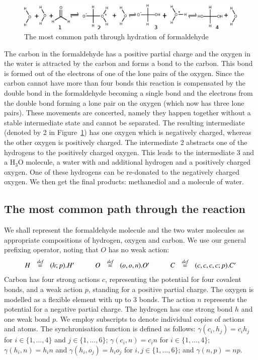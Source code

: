 \documentclass[preprint,12pt]{elsarticle}
\newcommand{\bydef}{\stackrel{\emph{def}}{=}}
\begin{document}
\begin{figure}[h!]
  \centering
    \includegraphics[width=1\textwidth]{formaldehyde2}
  \caption{The most common path through hydration of formaldehyde}
  \label{fig:formal2}
\end{figure}

The carbon in the formaldehyde has a positive partial charge and the oxygen in the water is attracted by 
the carbon and forms a bond to the carbon. This bond is formed out of the electrons of one of the lone 
pairs of the oxygen. 
Since the carbon cannot have more than four bonds this reaction is compensated by 
the double bond in the formaldehyde becoming a single bond and the electrons from the double bond 
forming a lone pair on the oxygen (which now has three lone pairs). These movements are 
concerted, namely they happen together without a stable intermediate state
and cannot be separated. The resulting intermediate (denoted by 2 in Figure~\ref{fig:formal2}) 
has one oxygen which is negatively charged, whereas the other oxygen is positively 
charged. The intermediate 2 abstracts one of the hydrogens to the positively charged oxygen. 
This leads to the intermediate 3 and a $\mathrm{H_3O}$ molecule, 
a water with and additional hydrogen and a positively charged oxygen. One of these hydrogens can be 
re-donated to the negatively charged oxygen. We then get the final products:
methanediol and a molecule of water.

\subsection{The most common path through the reaction}

We shall represent the formaldehyde molecule and the two water molecules as appropriate 
compositions of hydrogen, oxygen and carbon. We use our general prefixing operator, noting that
$O$ has no weak action:
$$\begin{array}{lllllllll}
H & \bydef & (h;p).H' &\qquad O & \bydef & (o,o,n).O' &\qquad C & \bydef & (c,c,c,c;p).C'
\end{array}$$
Carbon has four strong actions $c$, representing the potential for four covalent bonds, and 
a weak action $p$, standing for a positive partial charge. The oxygen is modelled as a flexible 
element with up to 3 bonds. The action $n$ represents the potential for a negative partial charge. 
The hydrogen has one strong bond $h$ and one weak bond $p$.
We employ subscripts to denote individual copies of actions and atoms.
The synchronisation function is defined as follows: $\gamma(c_i,h_j) =  c_ih_j$ for 
$i \in \{1,\ldots, 4\}$ and $j\in\{1,\ldots,6\}$; $\gamma(c_i,n) = c_in$ for $i \in \{1,\ldots, 4\}$;
$\gamma(h_i,n) = h_in$ and $\gamma(h_i,o_j) = h_io_j$ for $i,j \in \{1,\ldots,6\}$; and 
$\gamma(n,p) = np$.
\end{document}
